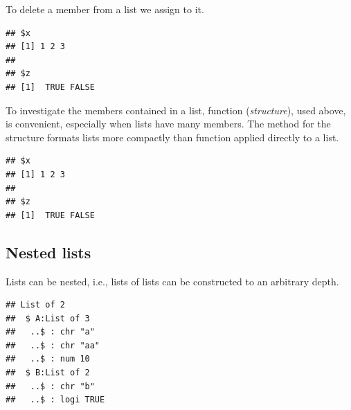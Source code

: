 \documentclass[krantz2]{krantz}\usepackage{knitr}
\begin{document}
To\label{par:calc:lists:rm} delete a member from a list we assign  to it.

\begin{knitrout}\footnotesize
{}\color{fgcolor}\begin{kframe}
\begin{alltt}
\hlopt{$} \hlkwb{<-} 
\end{alltt}
\begin{verbatim}
## $x
## [1] 1 2 3
## 
## $z
## [1]  TRUE FALSE
\end{verbatim}
\end{kframe}
\end{knitrout}

To investigate the members contained in a list, function  (\emph{structure}), used above, is convenient, especially when lists have many members. The  method for the structure formats lists more compactly than function  applied directly to a list.\label{par:calc:str}

\begin{knitrout}\footnotesize
{}\color{fgcolor}\begin{kframe}
\begin{alltt}
\end{alltt}
\begin{verbatim}
## $x
## [1] 1 2 3
## 
## $z
## [1]  TRUE FALSE
\end{verbatim}
\end{kframe}
\end{knitrout}


\subsection{Nested lists}\label{sec:calc:lists:nested}

Lists can be nested, i.e., lists of lists can be constructed to an arbitrary depth.

\begin{knitrout}\footnotesize
{}\color{fgcolor}\begin{kframe}
\begin{alltt}
 \hlkwb{<-} \hlstd{(}\hlstd{,} \hlstd{,} \hlstd{)}
 \hlkwb{<-} \hlstd{(}\hlstd{,} \hlstd{)}
 \hlkwb{<-} \hlstd{(}   
\end{alltt}
\begin{verbatim}
## List of 2
##  $ A:List of 3
##   ..$ : chr "a"
##   ..$ : chr "aa"
##   ..$ : num 10
##  $ B:List of 2
##   ..$ : chr "b"
##   ..$ : logi TRUE
\end{verbatim}
\end{kframe}
\end{knitrout}
\end{document}
